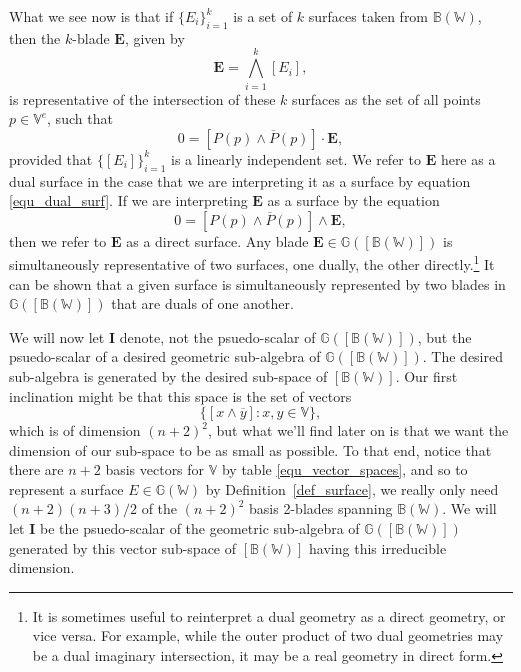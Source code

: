 \documentclass{birkjour}
\theoremstyle{definition}
\theoremstyle{remark}
\numberwithin{equation}{section}
\newcommand{\G}{\mathbb{G}}
\newcommand{\V}{\mathbb{V}}
\newcommand{\W}{\mathbb{W}}
\newcommand{\B}{\mathbb{B}}
\begin{document}
What we see now is that if $\{E_i\}_{i=1}^k$ is a set of $k$ surfaces taken from $\B(\W)$,
then the $k$-blade $\mathbf{E}$, given by
\begin{equation}
\mathbf{E} = \bigwedge_{i=1}^k[E_i],
\end{equation}
is representative of the intersection of these $k$ surfaces as the set
of all points $p\in\V^e$, such that
\begin{equation}\label{equ_dual_surf}
0=[P(p)\wedge\overline{P}(p)]\cdot\mathbf{E},
\end{equation}
provided that $\{[E_i]\}_{i=1}^k$ is a linearly independent set.
We refer to $\mathbf{E}$ here as a dual surface in the case that
we are interpreting it as a surface by equation \eqref{equ_dual_surf}.
If we are interpreting $\mathbf{E}$ as a surface by the equation
\begin{equation}
0=[P(p)\wedge\overline{P}(p)]\wedge\mathbf{E},
\end{equation}
then we refer to $\mathbf{E}$ as a direct surface.  Any blade $\mathbf{E}\in\G([\B(\W)])$
is simultaneously representative of two surfaces, one dually, the other directly.\footnote{It is
sometimes useful to reinterpret a dual geometry as a direct geometry, or vice versa.  For example,
while the outer product of two dual geometries may be a dual imaginary intersection, it may
be a real geometry in direct form.}
It can be shown that a given surface is simultaneously represented by two blades
in $\G([\B(\W)])$ that are duals of one another.

We will now let $\mathbf{I}$ denote, not the psuedo-scalar of $\G([\B(\W)])$, but
the psuedo-scalar of a desired geometric sub-algebra of $\G([\B(\W)])$.  The desired
sub-algebra is generated by the desired sub-space of $[\B(\W)]$.  Our first inclination
might be that this space is the set of vectors
\begin{equation}
\{[x\wedge\overline{y}]:x,y\in\V\},
\end{equation}
which is of dimension $(n+2)^2$, but what we'll find later on is that we want
the dimension of our sub-space to be as small as possible.  To that end,
notice that there
are $n+2$ basis vectors for $\V$ by table \eqref{equ_vector_spaces},
and so to represent a surface $E\in\G(\W)$ by Definition~\ref{def_surface},
we really only need $(n+2)(n+3)/2$ of the $(n+2)^2$ basis 2-blades spanning $\B(\W)$.
We will let $\mathbf{I}$ be
the psuedo-scalar of the geometric sub-algebra of $\G([\B(\W)])$ generated
by this vector sub-space of $[\B(\W)]$ having this irreducible dimension.
\end{document}
